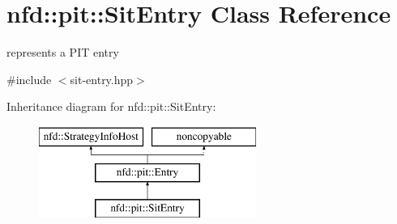 \hypertarget{classnfd_1_1pit_1_1SitEntry}{}\section{nfd\+:\+:pit\+:\+:Sit\+Entry Class Reference}
\label{classnfd_1_1pit_1_1SitEntry}


represents a P\+IT entry  




{\ttfamily \#include $<$sit-\/entry.\+hpp$>$}

Inheritance diagram for nfd\+:\+:pit\+:\+:Sit\+Entry\+:\begin{figure}[H]
\begin{center}
\leavevmode
\includegraphics[height=3.000000cm]{classnfd_1_1pit_1_1SitEntry}
\end{center}
\end{figure}
